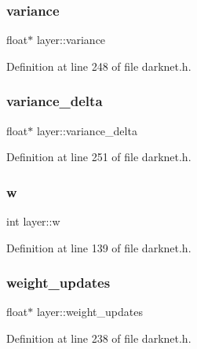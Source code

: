 \mbox{\label{structlayer_a4307e89c5c91bef35a9b54e4662e247d}} 
\subsubsection{\texorpdfstring{variance}{variance}}
{\footnotesize\ttfamily float$\ast$ layer\+::variance}



Definition at line 248 of file darknet.\+h.

\mbox{\label{structlayer_a6ac77051b9f79c2a72732b7b7f3f536c}} 
\subsubsection{\texorpdfstring{variance\_delta}{variance\_delta}}
{\footnotesize\ttfamily float$\ast$ layer\+::variance\+\_\+delta}



Definition at line 251 of file darknet.\+h.

\mbox{\label{structlayer_a2e00450d79170c48791a1ed5a6f1d0c4}} 
\subsubsection{\texorpdfstring{w}{w}}
{\footnotesize\ttfamily int layer\+::w}



Definition at line 139 of file darknet.\+h.

\mbox{\label{structlayer_a24eda1775cf0b0e188446089a25780b7}} 
\subsubsection{\texorpdfstring{weight\_updates}{weight\_updates}}
{\footnotesize\ttfamily float$\ast$ layer\+::weight\+\_\+updates}



Definition at line 238 of file darknet.\+h.

